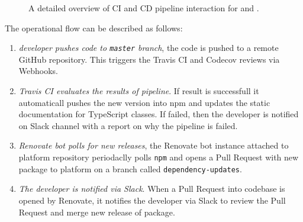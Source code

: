\begin{figure}[h]
\centering
{}
\caption{A detailed overview of CI and CD pipeline interaction for \lpa{} and \lpas{}.}
\label{fig:lpas_ci_integration}
\end{figure}

The operational flow can be described as follows:
\begin{enumerate}
    \item \textit{\lpas{} developer pushes code to \texttt{master} branch}, the code is pushed to a remote GitHub repository. This triggers the Travis CI and Codecov reviews via Webhooks.
    \item \textit{Travis CI evaluates the results of pipeline}. If result is successfull it automaticall pushes the new version into npm and updates the static documentation for TypeScript classes. If failed, then the \lpas{} developer is notified on Slack channel with a report on why the pipeline is failed.
    \item \textit{Renovate bot polls for new \lpas{} releases}, the Renovate bot instance attached to \lpa{} platform repository periodaclly polls \texttt{npm} and opens a Pull Request with new \lpas{} package to \lpa{} platform on a branch called \texttt{dependency-updates}. 
    \item \textit{The \lpa{} developer is notified via Slack}. When a Pull Request into \lpa{} codebase is opened by Renovate, it notifies the \lpa{} developer via Slack to review the Pull Request and merge new release of \lpas{} package.
\end{enumerate} 